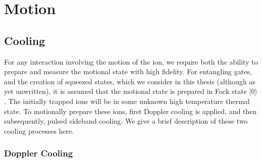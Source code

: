 \section{Motion}
\label{sec:Motion}

\subsection{Cooling}
\label{sec:Cooling}

    For any interaction involving the motion of the ion, we require both the
    ability to prepare and measure the motional state with high fidelity. For
    entangling gates, and the creation of squeezed states, which we 
    consider in this thesis (although as yet unwritten), it is assumed that the motional state is prepared in Fock state $|0\rangle$. The initially trapped ions will
    be in some unknown high temperature thermal state. To motionally prepare these ions, first Doppler cooling is applied, and then
    subsequently, pulsed sideband cooling. We give a brief description of these two
    cooling processes here.\\

\subsubsection{Doppler Cooling}

